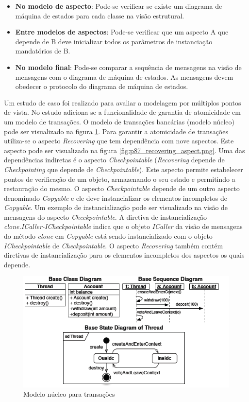 \begin{itemize}
  \item \textbf{No modelo de aspecto}: Pode-se verificar se existe um diagrama de máquina de estados para cada classe na visão estrutural.
  \item \textbf{Entre modelos de aspectos}: Pode-se verificar que um aspecto A que depende de B deve inicializar todos os parâmetros de instanciação
  mandatórios de B.
  \item \textbf{No modelo final}: Pode-se comparar a sequência de mensagens na visão de mensagens com o diagrama de máquina de estados. As mensagens
  devem obedecer o protocolo do diagrama de máquina de estados.
\end{itemize}

Um estudo de caso foi realizado para avaliar a modelagem por múltiplos pontos de vista. No estudo adiciona-se a funcionalidade de garantia de
atomicidade em um modelo de transações. O modelo de transações bancárias (modelo núcleo) pode ser visualizado na figura \ref{fig:p87_base_model}. Para
garantir a atomicidade de transações utiliza-se o aspecto \textit{Recovering} que tem dependência com nove aspectos. Este aspecto pode ser visualizado 
na figura \ref{fig:p87_recovering_aspect.png}. Uma das dependências indiretas é o aspecto \textit{Checkpointable} (\textit{Recovering} depende de
\textit{Checkpointing} que depende de \textit{Checkpointable}). Este aspecto permite estabelecer pontos de verificação de um objeto, armazenando o seu estado e permitindo a restauração do mesmo. O aspecto \textit{Checkpointable} depende 
de um outro aspecto denominado \textit{Copyable} e ele deve instancializar os elementos incompletos de \textit{Copyable}. Um exemplo de
instancialização pode ser visualizado na visão de mensagens do aspecto \textit{Checkpointable}. A diretiva de instancialização \textit{clone.ICaller-ICheckpointable} 
indica que o objeto \textit{ICaller} da visão de mensagens do método \textit{clone} em \textit{Copyable} está sendo instancializado com o objeto
\textit{ICheckpointable} de \textit{Checkpointable}. O aspecto \textit{Recovering} também contém diretivas de instancialização para os elementos 
incompletos dos aspectos os quais depende.

\begin{landscape}
\begin{figure}
	\centering
	\includegraphics[scale=0.8]{img/p87_base_model.png}
	\caption{Modelo núcleo para transações}\label{fig:p87_base_model}
\end{figure}
\end{landscape}

